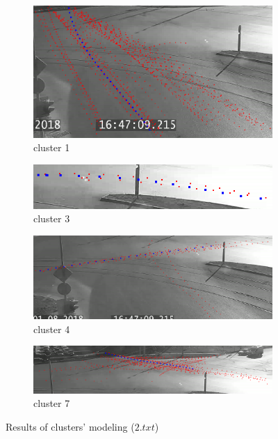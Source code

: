 \begin{figure}[!htb]
	\centering
	\begin{subfigure}[!htb]{0.7\textwidth}
		\centering{}
		\includegraphics[width=\textwidth]{images/cm-1-from-8-0_95.png}
		\caption{cluster 1}
	\end{subfigure}
	\hfill
	\begin{subfigure}[!htb]{0.7\textwidth}
		\centering{}
		\includegraphics[width=\textwidth]{images/cm-3-from-8-0_95.png}
		\caption{cluster 3}
	\end{subfigure}
	\hfill
	\begin{subfigure}[!htb]{0.7\textwidth}
		\centering{}
		\includegraphics[width=\textwidth]{images/cm-4-from-8-0_95.png}
		\caption{cluster 4}
	\end{subfigure}
	\hfill
	\begin{subfigure}[!htb]{0.7\textwidth}
		\centering{}
		\includegraphics[width=\textwidth]{images/cm-7-from-8-0_95.png}
		\caption{cluster 7}
	\end{subfigure}
	
	\caption{Results of clusters' modeling ($2.txt$)}
	\label{fig:cm-res}
\end{figure}